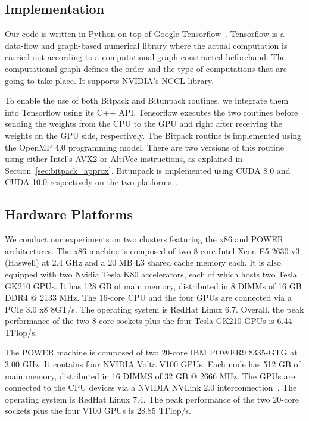 \subsection{Implementation}
Our code is written in Python on top of Google Tensorflow~\cite{tensorflow}.
Tensorflow is a data-flow and graph-based numerical library where the actual 
computation is carried out according to a computational graph constructed 
beforehand.
The computational graph defines the order and the type of computations that are 
going to take place. It supports NVIDIA's NCCL library.

To enable the use of both Bitpack and Bitunpack routines, we integrate them into 
Tensorflow using its C++ API.
Tensorflow executes the two routines before sending the weights from the CPU to 
the GPU and right after receiving the weights on the GPU side, respectively.
The Bitpack routine is implemented using the OpenMP 4.0 programming model.  
There are two versions of this routine using either Intel's AVX2 or AltiVec 
instructions, as explained in Section~\ref{sec:bitpack_approx}.
Bitunpack is implemented using CUDA 8.0 and CUDA 10.0 respectively on the two 
platforms~\cite{cuda}.

\subsection{Hardware Platforms}
\label{sec:platform}
We conduct our experiments on two clusters featuring the x86 and POWER 
architectures.
The x86 machine is composed of two 8-core Intel Xeon
\textregistered E5-2630 v3 (Haswell) at 2.4 GHz and a 20 MB L3 shared cache 
memory each.  It is also equipped with two Nvidia Tesla K80 accelerators, each 
of which hosts two Tesla GK210 GPUs.
It has 128 GB of main memory, distributed in 8 DIMMs of 16 GB DDR4 @ 2133 MHz.
The 16-core CPU and the four GPUs are connected via a PCIe 3.0 x8 8GT/s.
The operating system is RedHat Linux 6.7.
Overall, the peak performance of the two 8-core sockets plus the four Tesla 
GK210 GPUs is 6.44 TFlop/s.

The POWER machine is composed of two 20-core IBM POWER9 8335-GTG at 3.00 GHz.  
It contains four NVIDIA Volta V100 GPUs.  Each node has 512 GB of main memory, 
distributed in 16 DIMMS of 32 GB @ 2666 MHz.
The GPUs are connected to the CPU devices via a NVIDIA NVLink 2.0 
interconnection~\cite{nvlink}.
The operating system is RedHat Linux 7.4.
The peak performance of the two 20-core sockets plus the four V100 GPUs is 28.85 
TFlop/s.
